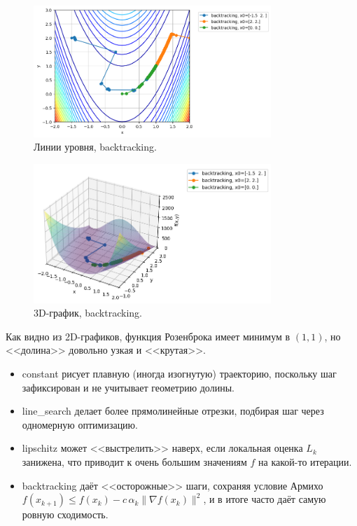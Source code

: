 \documentclass[a4paper,12pt]{article}
\begin{document}
\begin{figure}[H]
    \centering
    \includegraphics[width=0.8\textwidth]{images/task2/plot_levels_2_3_backtracking.png}
    \caption{Линии уровня, backtracking.}
\end{figure}
\begin{figure}[H]
    \centering
    \includegraphics[width=0.8\textwidth]{images/task2/plot_3d_2_3_backtracking.png}
    \caption{3D-график, backtracking.}
\end{figure}

Как видно из 2D-графиков, функция Розенброка имеет минимум в $(1,1)$, но <<долина>> довольно узкая и <<крутая>>. 
\begin{itemize}
    \item constant рисует плавную (иногда изогнутую) траекторию, поскольку шаг зафиксирован и не учитывает геометрию долины.
    \item line\_search делает более прямолинейные отрезки, подбирая шаг через одномерную оптимизацию.
    \item lipschitz может <<выстрелить>> наверх, если локальная оценка $L_k$ занижена, что приводит к очень большим значениям $f$ на какой-то итерации.
    \item backtracking даёт <<осторожные>> шаги, сохраняя условие Армихо $f(x_{k+1}) \le f(x_k) - c\,\alpha_k \|\nabla f(x_k)\|^2$, и в итоге часто даёт самую ровную сходимость.
\end{itemize}
\end{document}
